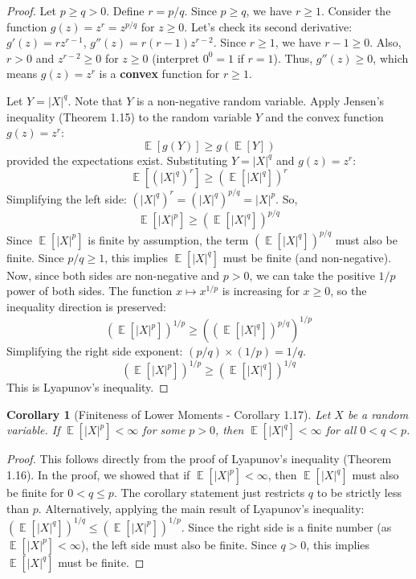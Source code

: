 \documentclass[11pt]{article}
\newtheorem{corollary}[theorem]{Corollary}
\theoremstyle{definition}
\theoremstyle{remark}
\DeclareMathOperator{\E}{\mathbb{E}} %
\begin{document}
\begin{proof}
Let $p \ge q > 0$. Define $r = p/q$. Since $p \ge q$, we have $r \ge 1$.
Consider the function $g(z) = z^r = z^{p/q}$ for $z \ge 0$. Let's check its second derivative: $g'(z) = r z^{r-1}$, $g''(z) = r(r-1) z^{r-2}$. Since $r \ge 1$, we have $r-1 \ge 0$. Also, $r>0$ and $z^{r-2} \ge 0$ for $z \ge 0$ (interpret $0^0=1$ if $r=1$). Thus, $g''(z) \ge 0$, which means $g(z) = z^r$ is a \textbf{convex} function for $r \ge 1$.

Let $Y = |X|^q$. Note that $Y$ is a non-negative random variable. Apply Jensen's inequality (Theorem 1.15) to the random variable $Y$ and the convex function $g(z) = z^r$:
\[
\E[g(Y)] \ge g(\E[Y])
\]
provided the expectations exist. Substituting $Y = |X|^q$ and $g(z) = z^r$:
\[
\E[(|X|^q)^r] \ge (\E[|X|^q])^r
\]
Simplifying the left side: $(|X|^q)^r = (|X|^q)^{p/q} = |X|^p$. So,
\[
\E[|X|^p] \ge (\E[|X|^q])^{p/q}
\]
Since $\E[|X|^p]$ is finite by assumption, the term $(\E[|X|^q])^{p/q}$ must also be finite. Since $p/q \ge 1$, this implies $\E[|X|^q]$ must be finite (and non-negative).
Now, since both sides are non-negative and $p > 0$, we can take the positive $1/p$ power of both sides. The function $x \mapsto x^{1/p}$ is increasing for $x \ge 0$, so the inequality direction is preserved:
\[
(\E[|X|^p])^{1/p} \ge ((\E[|X|^q])^{p/q})^{1/p}
\]
Simplifying the right side exponent: $(p/q) \times (1/p) = 1/q$.
\[
(\E[|X|^p])^{1/p} \ge (\E[|X|^q])^{1/q}
\]
This is Lyapunov's inequality.
\end{proof}

\begin{corollary}[Finiteness of Lower Moments - Corollary 1.17]
Let $X$ be a random variable. If $\E[|X|^p] < \infty$ for some $p > 0$, then $\E[|X|^q] < \infty$ for all $0 < q < p$.
\end{corollary}
\begin{proof}
This follows directly from the proof of Lyapunov's inequality (Theorem 1.16). In the proof, we showed that if $\E[|X|^p] < \infty$, then $\E[|X|^q]$ must also be finite for $0 < q \le p$. The corollary statement just restricts $q$ to be strictly less than $p$.
Alternatively, applying the main result of Lyapunov's inequality: $(\E[|X|^q])^{1/q} \le (\E[|X|^p])^{1/p}$. Since the right side is a finite number (as $\E[|X|^p] < \infty$), the left side must also be finite. Since $q > 0$, this implies $\E[|X|^q]$ must be finite.
\end{proof}
\end{document}
